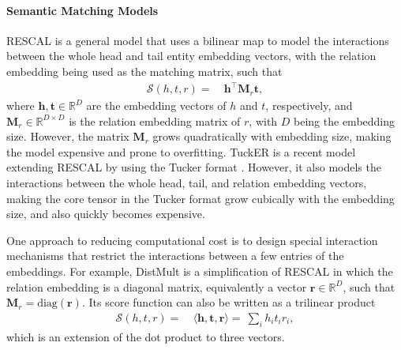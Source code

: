 \documentclass{ecai}
\def\vh{{\bm{h}}}
\def\vr{{\bm{r}}}
\def\vt{{\bm{t}}}
\def\mM{{\bm{M}}}
\def\gS{{\mathcal{S}}}
\def\sR{{\mathbb{R}}}
\newcommand{\diag}{{\text{diag}}} \newcommand{\concat}{{\mathbin{+\mkern-10mu+}}} \newcommand{\horizontalconcat}{{^{\frown}}}
\theoremstyle{plain}  \newtheorem{thm}{Theorem}  \newtheorem{lem}[thm]{Lemma}  \newtheorem{prop}[thm]{Proposition}
\theoremstyle{remark}  \newtheorem*{rem}{Remark}
\begin{document}
\paragraph{Semantic Matching Models}
RESCAL \cite{nickel_threewaymodelcollective_2011} is a general model that uses a bilinear map to model the interactions between the whole head and tail entity embedding vectors, with the relation embedding being used as the matching matrix, such that 
\begin{equation} \label{eq:rescal}
\begin{split}
\gS(h,t,r) =\ &\vh^\top \mM_r \vt,
\end{split}
\end{equation}
where $ \vh, \vt \in \sR^D $ are the embedding vectors of $ h $ and $ t $, respectively, and $ \mM_r \in \sR^{D \times D} $ is the relation embedding matrix of $ r $, with $ D $ being the embedding size. However, the matrix $ \mM_r $ grows quadratically with embedding size, making the model expensive and prone to overfitting. TuckER \cite{balazevic_tuckertensorfactorization_2019} is a recent model extending RESCAL by using the Tucker format \cite{tucker_mathematicalnotesthreemode_1966}. However, it also models the interactions between the whole head, tail, and relation embedding vectors, making the core tensor in the Tucker format grow cubically with the embedding size, and also quickly becomes expensive.

One approach to reducing computational cost is to design special interaction mechanisms that restrict the interactions between a few entries of the embeddings. For example, DistMult \cite{yang_embeddingentitiesrelations_2015} is a simplification of RESCAL in which the relation embedding is a diagonal matrix, equivalently a vector $ \vr \in \sR^D $, such that $ \mM_r = \diag(\vr) $. Its score function can also be written as a trilinear product
\begin{equation} \label{eq:trilinear}
\begin{split}
\gS(h,t,r) =\ &\langle \vh, \vt, \vr \rangle =\ \textstyle \sum_i h_i t_i r_i,
\end{split}
\end{equation}
which is an extension of the dot product to three vectors. 
\end{document}
